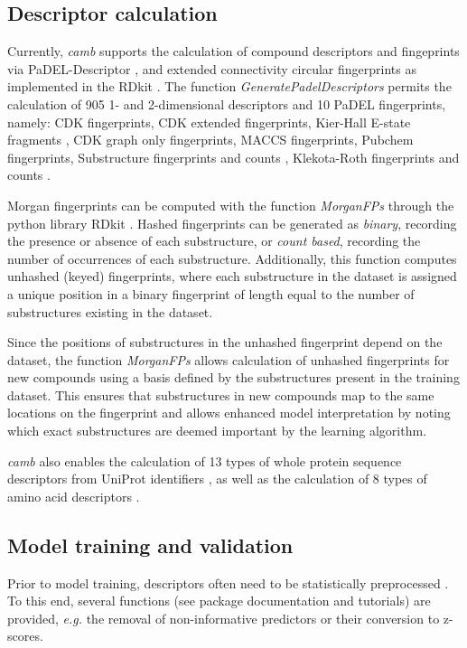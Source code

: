 \documentclass{bioinfo}
\begin{document}
\subsection{Descriptor calculation} 

Currently, {\it camb} supports the calculation of compound descriptors and fingeprints via PaDEL-Descriptor \citep{padel},
and extended connectivity circular fingerprints \citep{extended_fp} as implemented in the RDkit \citep{rdkit}.
The function {\it GeneratePadelDescriptors} permits the calculation of 905 1- and 2-dimensional descriptors and 10 PaDEL fingerprints, namely: 
CDK fingerprints, CDK extended fingerprints, Kier-Hall E-state fragments \cite{state_fp}, CDK graph only fingerprints, MACCS fingerprints,
Pubchem fingerprints, Substructure fingerprints and counts \citep{obabel}, Klekota-Roth fingerprints and counts \citep{privileged_substructures}.

Morgan fingerprints can be computed with the function {\it MorganFPs}
through the python library RDkit \citep{rdkit}.
Hashed fingerprints can be generated as \textit{binary}, recording the presence or absence of each substructure,
 or \textit{count based}, recording the number of occurrences of each substructure.
Additionally, this function computes unhashed (keyed) fingerprints, 
where each substructure in the dataset is assigned a unique position in a binary fingerprint of length equal to the number of substructures existing in the dataset.

Since the positions of substructures in the unhashed fingerprint depend on the dataset, the function {\it MorganFPs} allows calculation of unhashed fingerprints for new compounds using a basis defined by the substructures present in the training dataset. This ensures that substructures in new compounds map to the same locations on the fingerprint and allows enhanced model interpretation by noting which exact substructures are deemed important by the learning algorithm.

{\it camb} also enables the calculation of 13 types of whole protein sequence descriptors
from UniProt identifiers \citep{protr},
as well as the calculation of 8 types of amino acid descriptors \citep{AA_benchmark}.

\subsection{Model training and validation}

Prior to model training, descriptors often need to be statistically preprocessed \citep{andersson}.
To this end, several functions (see package documentation and tutorials)
are provided, {\it e.g.} the removal of non-informative predictors or
their conversion to z-scores.
\end{document}
